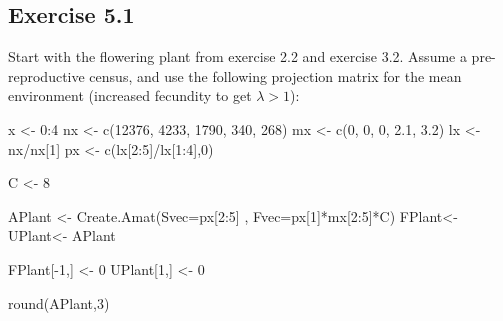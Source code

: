 \documentclass[
]{book}
\newenvironment{Shaded}{\begin{snugshade}}{\end{snugshade}}
\newcommand{\AttributeTok}[1]{\textcolor[rgb]{0.77,0.63,0.00}{#1}}
\newcommand{\DecValTok}[1]{\textcolor[rgb]{0.00,0.00,0.81}{#1}}
\newcommand{\FloatTok}[1]{\textcolor[rgb]{0.00,0.00,0.81}{#1}}
\newcommand{\FunctionTok}[1]{\textcolor[rgb]{0.00,0.00,0.00}{#1}}
\newcommand{\NormalTok}[1]{#1}
\newcommand{\OtherTok}[1]{\textcolor[rgb]{0.56,0.35,0.01}{#1}}
\newcommand{\SpecialCharTok}[1]{\textcolor[rgb]{0.00,0.00,0.00}{#1}}
\begin{document}
\hypertarget{exercise-5.1}{%
\subsection*{Exercise 5.1}\label{exercise-5.1}}

Start with the flowering plant from exercise 2.2 and exercise 3.2. Assume a pre-reproductive census, and use the following projection matrix for the mean environment (increased fecundity to get \(\lambda>1\)):

\begin{Shaded}
\begin{Highlighting}[]
\NormalTok{x }\OtherTok{\textless{}{-}} \DecValTok{0}\SpecialCharTok{:}\DecValTok{4} 
\NormalTok{nx }\OtherTok{\textless{}{-}} \FunctionTok{c}\NormalTok{(}\DecValTok{12376}\NormalTok{, }\DecValTok{4233}\NormalTok{, }\DecValTok{1790}\NormalTok{, }\DecValTok{340}\NormalTok{, }\DecValTok{268}\NormalTok{)}
\NormalTok{mx }\OtherTok{\textless{}{-}} \FunctionTok{c}\NormalTok{(}\DecValTok{0}\NormalTok{, }\DecValTok{0}\NormalTok{, }\DecValTok{0}\NormalTok{, }\FloatTok{2.1}\NormalTok{, }\FloatTok{3.2}\NormalTok{)}
\NormalTok{lx }\OtherTok{\textless{}{-}}\NormalTok{ nx}\SpecialCharTok{/}\NormalTok{nx[}\DecValTok{1}\NormalTok{]  }
\NormalTok{px }\OtherTok{\textless{}{-}} \FunctionTok{c}\NormalTok{(lx[}\DecValTok{2}\SpecialCharTok{:}\DecValTok{5}\NormalTok{]}\SpecialCharTok{/}\NormalTok{lx[}\DecValTok{1}\SpecialCharTok{:}\DecValTok{4}\NormalTok{],}\DecValTok{0}\NormalTok{) }

\NormalTok{C }\OtherTok{\textless{}{-}} \DecValTok{8} 

\NormalTok{APlant }\OtherTok{\textless{}{-}} \FunctionTok{Create.Amat}\NormalTok{(}\AttributeTok{Svec=}\NormalTok{px[}\DecValTok{2}\SpecialCharTok{:}\DecValTok{5}\NormalTok{] , }\AttributeTok{Fvec=}\NormalTok{px[}\DecValTok{1}\NormalTok{]}\SpecialCharTok{*}\NormalTok{mx[}\DecValTok{2}\SpecialCharTok{:}\DecValTok{5}\NormalTok{]}\SpecialCharTok{*}\NormalTok{C)}
\NormalTok{FPlant}\OtherTok{\textless{}{-}}\NormalTok{ UPlant}\OtherTok{\textless{}{-}}\NormalTok{ APlant}

\NormalTok{FPlant[}\SpecialCharTok{{-}}\DecValTok{1}\NormalTok{,] }\OtherTok{\textless{}{-}} \DecValTok{0} 
\NormalTok{UPlant[}\DecValTok{1}\NormalTok{,] }\OtherTok{\textless{}{-}} \DecValTok{0}  

\FunctionTok{round}\NormalTok{(APlant,}\DecValTok{3}\NormalTok{)}
\end{Highlighting}
\end{Shaded}
\end{document}

